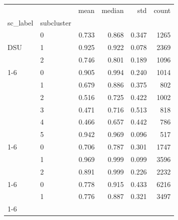 \begin{tabular}{llrrrr}
\toprule
 &  & mean & median & std & count \\
sc_label & subcluster &  &  &  &  \\
\midrule
\multirow[t]{3}{*}{DSU} & 0 & 0.733 & 0.868 & 0.347 & 1265 \\
 & 1 & 0.925 & 0.922 & 0.078 & 2369 \\
 & 2 & 0.746 & 0.801 & 0.189 & 1096 \\
\cline{1-6}
\multirow[t]{6}{*}{SD} & 0 & 0.905 & 0.994 & 0.240 & 1014 \\
 & 1 & 0.679 & 0.886 & 0.375 & 802 \\
 & 2 & 0.516 & 0.725 & 0.422 & 1002 \\
 & 3 & 0.471 & 0.716 & 0.513 & 818 \\
 & 4 & 0.466 & 0.657 & 0.442 & 786 \\
 & 5 & 0.942 & 0.969 & 0.096 & 517 \\
\cline{1-6}
\multirow[t]{3}{*}{SU} & 0 & 0.706 & 0.787 & 0.301 & 1747 \\
 & 1 & 0.969 & 0.999 & 0.099 & 3596 \\
 & 2 & 0.891 & 0.999 & 0.226 & 2232 \\
\cline{1-6}
\multirow[t]{2}{*}{TU} & 0 & 0.778 & 0.915 & 0.433 & 6216 \\
 & 1 & 0.776 & 0.887 & 0.321 & 3497 \\
\cline{1-6}
\bottomrule
\end{tabular}
